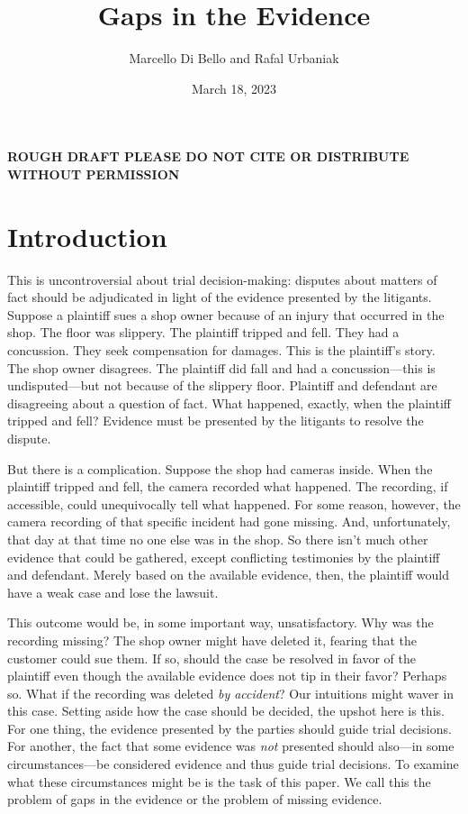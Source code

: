 \documentclass[
  10pt,
  dvipsnames,enabledeprecatedfontcommands]{scrartcl}
\title{Gaps in the Evidence}
\author{Marcello Di Bello and Rafal Urbaniak}
\date{March 18, 2023}
\begin{document}
\maketitle

\tableofcontents

\vspace{1cm}

\textbf{ROUGH DRAFT PLEASE DO NOT CITE OR DISTRIBUTE WITHOUT PERMISSION}

\vspace{6cm}

\hypertarget{introduction}{%
\section{Introduction}\label{introduction}}

This is uncontroversial about trial decision-making: disputes about
matters of fact should be adjudicated in light of the evidence presented
by the litigants. Suppose a plaintiff sues a shop owner because of an
injury that occurred in the shop. The floor was slippery. The plaintiff
tripped and fell. They had a concussion. They seek compensation for
damages. This is the plaintiff's story. The shop owner disagrees. The
plaintiff did fall and had a concussion---this is undisputed---but not
because of the slippery floor. Plaintiff and defendant are disagreeing
about a question of fact. What happened, exactly, when the plaintiff
tripped and fell? Evidence must be presented by the litigants to resolve
the dispute.

But there is a complication. Suppose the shop had cameras inside. When
the plaintiff tripped and fell, the camera recorded what happened. The
recording, if accessible, could unequivocally tell what happened. For
some reason, however, the camera recording of that specific incident had
gone missing. And, unfortunately, that day at that time no one else was
in the shop. So there isn't much other evidence that could be gathered,
except conflicting testimonies by the plaintiff and defendant. Merely
based on the available evidence, then, the plaintiff would have a weak
case and lose the lawsuit.

This outcome would be, in some important way, unsatisfactory. Why was
the recording missing? The shop owner might have deleted it, fearing
that the customer could sue them. If so, should the case be resolved in
favor of the plaintiff even though the available evidence does not tip
in their favor? Perhaps so. What if the recording was deleted \emph{by
accident}? Our intuitions might waver in this case. Setting aside how
the case should be decided, the upshot here is this. For one thing, the
evidence presented by the parties should guide trial decisions. For
another, the fact that some evidence was \textit{not} presented should
also---in some circumstances---be considered evidence and thus guide
trial decisions. To examine what these circumstances might be is the
task of this paper. We call this the problem of gaps in the evidence or
the problem of missing evidence.
\end{document}
